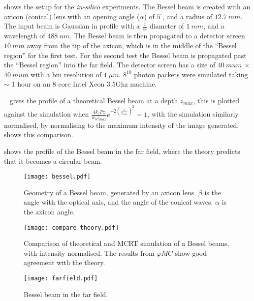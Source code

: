  shows the setup for the \textit{in-silico} experiments.
The Bessel beam is created with an axicon (conical) lens with an opening angle ($\alpha$) of $5^{\circ}$, and a radius of $12.7~mm$.
The input beam is Gaussian in profile with a $\tfrac{1}{e^2}$ diameter of $1~mm$, and a wavelength of $488~nm$.
The Bessel beam is then propagated to a detector screen $10~mm$ away from the tip of the axicon, which is in the middle of the ``Bessel region'' for the first test.
For the second test the Bessel beam is propagated past the ``Bessel region'' into the far field.
The detector screen has a size of $40~mu m$ $\times$ $40~mu m$ with a bin resolution of $1~\mu m$.
$8^10$ photon packets were simulated taking $\sim$ 1 hour on an 8 core Intel Xeon 3.5Ghz machine.

\medskip

~ gives the profile of a theoretical Bessel beam at a depth $z_{max}$, this is plotted against the simulation when $\tfrac{4k_rPz}{w_0z_{max}}e^{-2\left(\tfrac{z}{z_{max}}\right)^2}=1$, with the simulation similarly normalised, by normalising to the maximum intensity of the image generated. ~ shows this comparison.

 shows the profile of the Bessel beam in the far field, where the theory predicts that it becomes a circular beam.

\begin{figure}[!ht]
    \centering
    \texttt{[image: bessel.pdf]}
    \caption{Geometry of a Bessel beam, generated by an axicon lens. $\beta$ is the angle with the optical axis, and the angle of the conical waves. $\alpha$ is the axicon angle.}
    \label{fig:besselgeo}
\end{figure}




\begin{figure}[!ht]
    \centering
    \texttt{[image: compare-theory.pdf]}
    \caption{Comparison of theoretical and MCRT simulation of a Bessel beams, with intensity normalised. The results from $\varphi MC$ show good agreement with the theory.}
    \label{fig:besselCompare}
\end{figure}

\begin{figure}
\centering
\texttt{[image: farfield.pdf]}
\caption{Bessel beam in the far field.}
\label{fig:farfield}
\end{figure}

